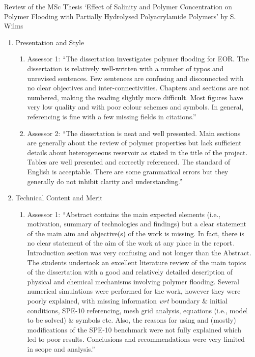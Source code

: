 \documentclass[14pt,twoside]{report}
\begin{document}
\begin{center}
  {\Large Review of the MSc Thesis `Effect of Salinity and Polymer Concentration on Polymer Flooding with Partially Hydrolysed Polyacrylamide Polymers' by S. Wilms}
\end{center}
\begin{enumerate}%
\item Presentation and Style
    \begin{enumerate}%
       \item Assessor 1: ``The dissertation investigates polymer flooding for EOR. The dissertation is relatively well-written with a number of typos and unrevised sentences. Few sentences are confusing and disconnected with no clear objectives and inter-connectivities. Chapters and sections are not numbered, making the reading slightly more difficult. Most figures have very low quality and with poor colour schemes and symbols. In general, referencing is fine with a few missing fields in citations.''
       \item Assessor 2: ``The dissertation is neat and well presented. Main sections are generally about the review of polymer properties but lack sufficient details about heterogeneous reservoir as stated in the title of the project. Tables are well presented and correctly referenced. The standard of English is acceptable. There are some grammatical errors but they generally do not inhibit clarity and understanding.''
    \end{enumerate}
%  
   \item Technical Content and Merit
    \begin{enumerate}%
       \item Assessor 1: ``Abstract contains the main expected elements (i.e., motivation, summary of technologies and findings) but a clear statement of the main aim and objective(s) of the work is missing. In fact, there is no clear statement of the aim of the work at any place in the report. Introduction section was very confusing and not longer than the Abstract. The students undertook an excellent literature review of the main topics of the dissertation with a good and relatively detailed description of physical and chemical mechanisms involving polymer flooding. Several numerical simulations were performed for the work, however they were poorly explained, with missing information {\it wrt} boundary $\&$ initial conditions, SPE-10 referencing, mesh grid analysis, equations (i.e., model to be solved) $\&$ symbols etc. Also, the reasons for using and (mostly) modifications of the SPE-10 benchmark were not fully explained which led to poor results. Conclusions and recommendations were very limited in scope and analysis.''

\end{enumerate}
\end{enumerate}
\end{document}
